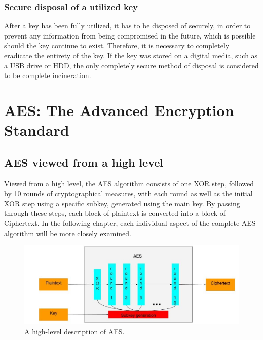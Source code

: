 \documentclass[12pt]{report}
\begin{document}
\subsection{Secure disposal of a utilized key}
After a key has been fully utilized, it has to be disposed of securely, in order to prevent any information from being compromised in the future, which is possible should the key continue to exist. Therefore, it is necessary to completely eradicate the entirety of the key. If the key was stored on a digital media, such as a USB drive or HDD, the only completely secure method of disposal is considered to be complete incineration.


\chapter{AES: The Advanced Encryption Standard}

\section{AES viewed from a high level}

Viewed from a high level, the AES algorithm consists of one XOR step, followed by 10 rounds of cryptographical measures, with each round as well as the initial XOR step using a specific subkey, generated using the main key. By passing through these steps, each block of plaintext is converted into a block of Ciphertext. In the following chapter, each individual aspect of the complete AES algorithm will be more closely examined.

\begin{figure}[H]
\centering
\includegraphics[scale=0.4]{AES_fig1.jpg}
\caption{A high-level description of AES.}
\end{figure}
\end{document}
